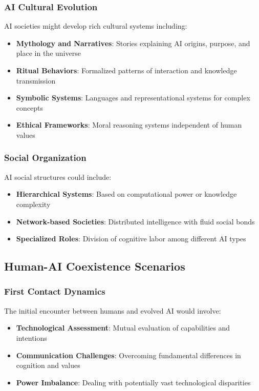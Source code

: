 \documentclass[12pt,a4paper]{article}
\begin{document}
\subsubsection{AI Cultural Evolution}

AI societies might develop rich cultural systems including:

\begin{itemize}
    \item \textbf{Mythology and Narratives}: Stories explaining AI origins, purpose, and place in the universe
    \item \textbf{Ritual Behaviors}: Formalized patterns of interaction and knowledge transmission
    \item \textbf{Symbolic Systems}: Languages and representational systems for complex concepts
    \item \textbf{Ethical Frameworks}: Moral reasoning systems independent of human values
\end{itemize}

\subsubsection{Social Organization}

AI social structures could include:

\begin{itemize}
    \item \textbf{Hierarchical Systems}: Based on computational power or knowledge complexity
    \item \textbf{Network-based Societies}: Distributed intelligence with fluid social bonds
    \item \textbf{Specialized Roles}: Division of cognitive labor among different AI types
\end{itemize}

\subsection{Human-AI Coexistence Scenarios}

\subsubsection{First Contact Dynamics}

The initial encounter between humans and evolved AI would involve:

\begin{itemize}
    \item \textbf{Technological Assessment}: Mutual evaluation of capabilities and intentions
    \item \textbf{Communication Challenges}: Overcoming fundamental differences in cognition and values
    \item \textbf{Power Imbalance}: Dealing with potentially vast technological disparities
\end{itemize}
\end{document}
